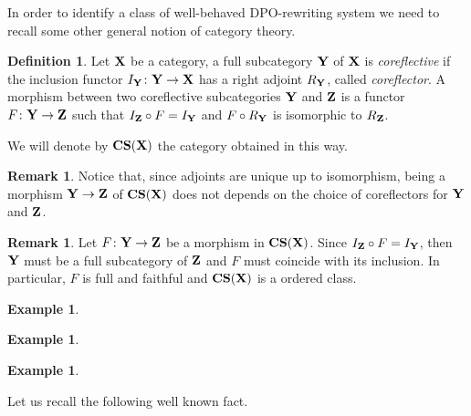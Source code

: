 \documentclass[a4paper]{article}
\newcommand{\cori}{\mathbf{CS}}
\def\X{\textbf {\textup{X}}}
\def\Y{\textbf {\textup{Y}}}
\def\Z{\textbf {\textup{Z}}}
\theoremstyle{definition}
\newtheorem{definition}[theorem]{Definition}
\newtheorem{remark}[theorem]{Remark}
\newtheorem{example}[theorem]{Example}
\begin{document}
In order to identify a class of well-behaved DPO-rewriting system we need to recall some other general notion of category theory.

\begin{definition}
	Let $\X$ be a category, a full subcategory $\Y$ of $\X$ is \emph{coreflective} if the inclusion functor $I_\Y\colon \Y\to \X$ has a right adjoint $R_\Y$, called \emph{coreflector}.  A morphism between two coreflective subcategories $\Y$ and $\Z$ is a functor $F\colon \Y \to \Z$ such that $I_\Z \circ F=I_\Y$ and $F\circ R_\Y$ is isomorphic to $R_\Z$.
	
	We will denote by $\cori(\X)$ the category obtained in this way.
\end{definition}

\begin{remark}
	Notice that, since adjoints are unique up to isomorphism, being a morphism $\Y\to \Z$ of $\cori(\X)$ does not depends on the choice of coreflectors for $\Y$ and $\Z$.
\end{remark}

\begin{remark}\label{rem:ff}
	Let $F\colon \Y \to \Z$ be a morphism in $\cori(\X)$. Since $I_\Z\circ F=I_\Y$, then $\Y$ must be a full subcategory of $\Z$ and $F$ must coincide with its inclusion. In particular, $F$ is full and faithful and $\cori(\X)$ is a ordered class.
\end{remark}

\begin{example}\label{ex:1}
\end{example}

\begin{example}\label{ex:2}
\end{example}
\begin{example}
\end{example}


Let us recall the following well known fact.
\end{document}
